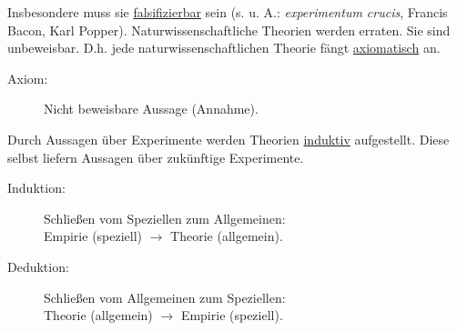 \begin{flushleft}
	
	Insbesondere muss sie \underline{falsifizierbar} sein (s. u. A.: \textit{experimentum crucis}, Francis Bacon, Karl Popper). Naturwissenschaftliche Theorien werden erraten. Sie sind unbeweisbar. D.h. jede naturwissenschaftlichen Theorie fängt \underline{axiomatisch} an.
	
	\begin{description}
		
		\item[Axiom:] \hfill
		
		Nicht beweisbare Aussage (Annahme).\\
		
	\end{description}
	
	\hfill \break Durch Aussagen über Experimente werden Theorien \underline{induktiv} aufgestellt. Diese selbst liefern Aussagen über zukünftige Experimente. \break
	
	\begin{description}
		
		\item[Induktion:] \hfill
		
		Schließen vom Speziellen zum Allgemeinen:\\ Empirie (speziell) $\longrightarrow$ Theorie (allgemein).\\
		
		\item[Deduktion:] \hfill
		
		Schließen vom Allgemeinen zum Speziellen:\\ Theorie (allgemein) $\longrightarrow$ Empirie (speziell).\\
		
	\end{description}
	
	
\end{flushleft}



\newpage



